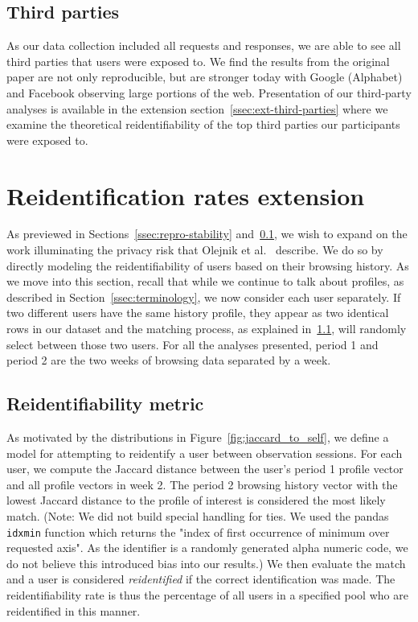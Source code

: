 \documentclass[letterpaper,twocolumn,10pt]{article}
\begin{document}
\subsection{Third parties}
\label{ssec:repro-third-parties}
As our data collection included all requests and responses, we are able to see all third parties that users were exposed to. 
We find the results from the original paper are not only reproducible, but are stronger today with Google (Alphabet) and Facebook observing large portions of the web. 
Presentation of our third-party analyses is available in the extension section~\ref{ssec:ext-third-parties} where we examine the theoretical reidentifiability of the top third parties our participants were exposed to.
%
\section{Reidentification rates extension}
\label{sec:extension}
As previewed in Sections~\ref{ssec:repro-stability} and~\ref{ssec:repro-third-parties}, we wish to expand on the work illuminating the privacy risk that Olejnik et al.~\cite{olejnikWhyJohnnyCan2012} describe. We do so by directly modeling the reidentifiability of users based on their browsing history. As we move into this section, recall that while we continue to talk about profiles, as described in Section~\ref{ssec:terminology}, we now consider each user separately. If two different users have the same history profile, they appear as two identical rows in our dataset and the matching process, as explained in~\ref{ssec:ext-metric}, will randomly select between those two users. For all the analyses presented, period 1 and period 2 are the two weeks of browsing data separated by a week. 
%
\subsection{Reidentifiability metric}
\label{ssec:ext-metric}
As motivated by the distributions in Figure~\ref{fig:jaccard_to_self}, we define a model for attempting to reidentify a user between observation sessions.
For each user, we compute the Jaccard distance between the user's period 1 profile vector and all profile vectors in week 2. The period 2 browsing history vector with the lowest Jaccard distance to the profile of interest is considered the most likely match. (Note: We did not build special handling for ties. We used the pandas \texttt{idxmin} function which returns the "index of first occurrence of minimum over requested axis". As the identifier is a randomly generated alpha numeric code, we do not believe this introduced bias into our results.)
We then evaluate the match and a user is considered \textit{reidentified} if the correct identification was made. The reidentifiability rate is thus the percentage of all users in a specified pool who are reidentified in this manner. 
\end{document}
